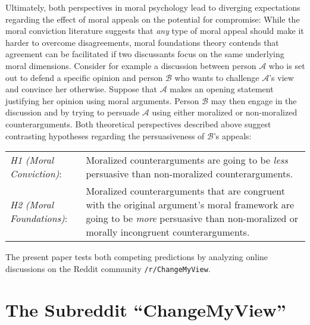 Ultimately, both perspectives in moral psychology lead to diverging expectations regarding the effect of moral appeals on the potential for compromise: While the moral conviction literature suggests that \textit{any} type of moral appeal should make it harder to overcome disagreements, moral foundations theory contends that agreement can be facilitated if two discussants focus on the same underlying moral dimensions. Consider for example a discussion between person $\mathcal{A}$ who is set out to defend a specific opinion and person $\mathcal{B}$ who wants to challenge $\mathcal{A}$'s view and convince her otherwise. Suppose that $\mathcal{A}$ makes an opening statement justifying her opinion using moral arguments. Person $\mathcal{B}$ may then engage in the discussion and by trying to persuade $\mathcal{A}$ using either moralized or non-moralized counterarguments. Both theoretical perspectives described above suggest contrasting hypotheses regarding the persuasiveness of $\mathcal{B}$'s appeals:
\begin{center}\singlespacing\begin{tabularx}{\textwidth}{lX}
\textit{H1 (Moral Conviction)}: & Moralized counterarguments are going to be \textit{less} persuasive than non-moralized counterarguments.\\
\textit{H2 (Moral Foundations)}: & Moralized counterarguments that are congruent with the original argument's moral framework are going to be \textit{more} persuasive than non-moralized or morally incongruent counterarguments.
\end{tabularx}\end{center}

The present paper tests both competing predictions by analyzing online discussions on the Reddit community \texttt{/r/ChangeMyView}. 



\section{The Subreddit ``ChangeMyView''}

